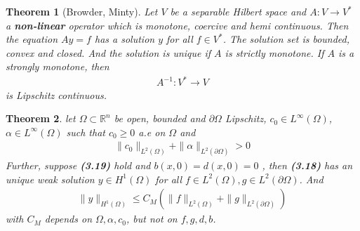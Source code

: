\documentclass[a4paper,11pt,fleqn]{book}
\newtheorem{theorem}{Theorem}[section]
\theoremstyle{definition}
\theoremstyle{remark}
\begin{document}
\begin{theorem}[Browder, Minty]
	Let $V$ be a separable Hilbert space and $A: V \rightarrow V^*$ a \textbf{non-linear} operator which is monotone, coercive and hemi continuous. Then the equation $Ay = f$ has a solution $y$ for all $f \in V^*$. The solution set is bounded, convex and closed. And the solution is unique if $A$ is strictly monotone. If $A$ is a strongly monotone, then 
	\begin{align*}
		A^{-1}: V^* \rightarrow V
	\end{align*}
	is Lipschitz continuous.
\end{theorem}

\begin{theorem}
	let $\Omega \subset \mathbb{R}^n$ be open, bounded and $\partial \Omega$ Lipschitz, $c_0 \in L^\infty(\Omega)$, $\alpha \in L^\infty(\Omega)$ such that $c_0 \ge 0$ a.e on $\Omega$ and
	\begin{align*}
		\|c_0\|_{L^2(\Omega)}+ \|\alpha\|_{L^2(\partial \Omega)} > 0
	\end{align*}
	Further, suppose \textbf{(3.19)} hold and $b(x, 0) = d(x, 0) = 0$ , then \textbf{(3.18)} has an unique weak solution $y \in H^1(\Omega)$ for all $f \in L^2(\Omega), g \in L^2(\partial\Omega)$. And 
	\begin{align*}
		\|y\|_{H^1(\Omega)} \le C_M (\|f\|_{L^2(\Omega)} + \|g\|_{L^2(\partial\Omega)})
	\end{align*}
	with $C_M$ depends on $\Omega, \alpha, c_0$, but not on $f, g, d, b$. 
\end{theorem}
\end{document}
